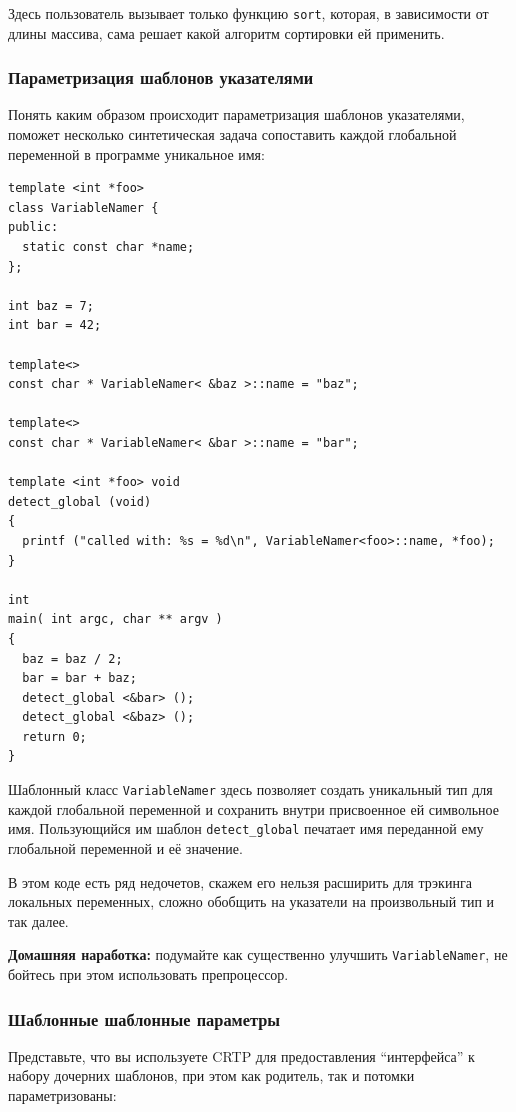 \documentclass[a4paper,12pt,oneside]{article}
\begin{document}
Здесь пользователь вызывает только функцию \lstinline!sort!, которая, в зависимости от длины массива, сама решает какой алгоритм сортировки ей применить.

\subsubsection{Параметризация шаблонов указателями}\label{PointerTemplateArguments}

Понять каким образом происходит параметризация шаблонов указателями, поможет несколько синтетическая задача сопоставить каждой глобальной переменной в программе уникальное имя:

\begin{lstlisting}
template <int *foo>
class VariableNamer {
public:
  static const char *name;
};

int baz = 7;
int bar = 42;

template<>
const char * VariableNamer< &baz >::name = "baz";

template<>
const char * VariableNamer< &bar >::name = "bar";

template <int *foo> void
detect_global (void)
{
  printf ("called with: %s = %d\n", VariableNamer<foo>::name, *foo);
}

int
main( int argc, char ** argv )
{
  baz = baz / 2;
  bar = bar + baz;
  detect_global <&bar> ();
  detect_global <&baz> ();
  return 0;
}
\end{lstlisting}

Шаблонный класс \lstinline!VariableNamer! здесь позволяет создать уникальный тип для каждой глобальной переменной и сохранить внутри присвоенное ей символьное имя. Пользующийся им шаблон \lstinline!detect_global! печатает имя переданной ему глобальной переменной и её значение.

В этом коде есть ряд недочетов, скажем его нельзя расширить для трэкинга локальных переменных, сложно обобщить на указатели на произвольный тип и так далее.

\textbf{Домашняя наработка:} подумайте как существенно улучшить \lstinline!VariableNamer!, не бойтесь при этом использовать препроцессор.

\subsubsection{Шаблонные шаблонные параметры}\label{TemplateTemplateArguments}

Представьте, что вы используете CRTP для предоставления ``интерфейса'' к набору дочерних шаблонов, при этом как родитель, так и потомки параметризованы:
\end{document}
